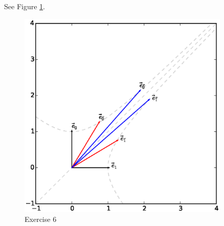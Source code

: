 \documentclass[gr-notes.tex]{subfiles}
\begin{document}
See Figure \ref{fig:exercise-6}.

\begin{figure}[h]
  \centering
  \includegraphics[width=0.9\textwidth]{img/problem6}
  \caption{Exercise 6}
  \label{fig:exercise-6}
\end{figure}
\end{document}
